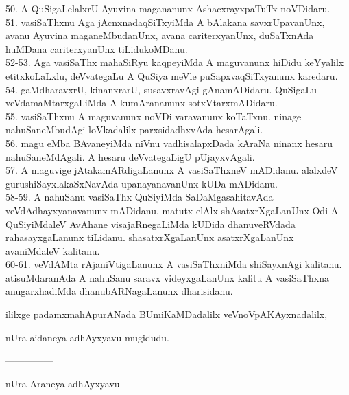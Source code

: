 \documentclass{article}
\begin{document}
50. A QuSigaLelalxrU Ayuvina magananunx AshacxrayxpaTuTx noVDidaru.\\
51. vasiSaThxnu Aga jAcnxnadaqSiTxyiMda A bAlakana savxrUpavanUnx, avanu Ayuvina maganeMbudanUnx, avana cariterxyanUnx, duSaTxnAda huMDana cariterxyanUnx tiLidukoMDanu.\\
52-53. Aga vasiSaThx mahaSiRyu kaqpeyiMda A maguvanunx hiDidu keYyalilx etitxkoLaLxlu, deVvategaLu A QuSiya meVle puSapxvaqSiTxyanunx karedaru.\\
54. gaMdharavxrU, kinanxrarU, susavxravAgi gAnamADidaru. QuSigaLu veVdamaMtarxgaLiMda A kumArananunx sotxVtarxmADidaru.\\
55. vasiSaThxnu A maguvanunx noVDi varavanunx koTaTxnu. ninage nahuSaneMbudAgi loVkadalilx parxsidadhxvAda hesarAgali.\\
56. magu eMba BAvaneyiMda niVnu vadhisalapxDada kAraNa ninanx hesaru nahuSaneMdAgali. A hesaru deVvategaLigU pUjayxvAgali.\\
57. A maguvige jAtakamARdigaLanunx A vasiSaThxneV mADidanu. alalxdeV gurushiSayxlakaSxNavAda upanayanavanUnx kUDa mADidanu.\\
58-59. A nahuSanu vasiSaThx QuSiyiMda SaDaMgasahitavAda veVdAdhayxyanavanunx mADidanu. matutx elAlx shAsatxrXgaLanUnx Odi A QuSiyiMdaleV AvAhane visajaRnegaLiMda kUDida dhanuveRVdada rahasayxgaLanunx tiLidanu. shasatxrXgaLanUnx asatxrXgaLanUnx avaniMdaleV kalitanu.\\
60-61. veVdAMta rAjaniVtigaLanunx A vasiSaThxniMda shiSayxnAgi kalitanu. atisuMdaranAda A nahuSanu saravx videyxgaLanUnx kalitu A vasiSaThxna anugarxhadiMda dhanubARNagaLanunx dharisidanu.\\

\begin{center}
ililxge padamxmahApurANada BUmiKaMDadalilx veVnoVpAKAyxnadalilx,
\end{center}

\begin{center}
nUra aidaneya adhAyxyavu mugidudu.
\end{center}

\begin{center}
---------------
\end{center}

\begin{center}
nUra Araneya adhAyxyavu
\end{center}
\end{document}
